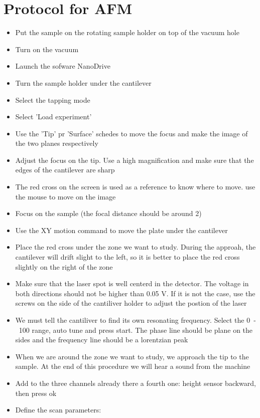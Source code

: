 \documentclass[a4paper]{article}
\begin{document}
\section{Protocol for AFM}
\begin{itemize}
  \item Put the sample on the rotating sample holder on top of the vacuum hole
  \item Turn on the vacuum
  \item Launch the sofware NanoDrive
  \item Turn the sample holder under the cantilever
  \item Select the tapping mode
  \item Select 'Load experiment'
  \item Use the 'Tip' pr 'Surface' schedes to move the focus and make the image of the two planes respectively
  \item Adjust the focus on the tip. Use a high magnification and make sure that the edges of the cantilever are sharp
  \item The red cross on the screen is used as a reference to know where to move. use the mouse to move on the image
  \item Focus on the sample (the focal distance should be around \unit{2}{\milli\meter})
  \item Use the XY motion command to move the plate under the cantilever
  \item Place the red cross under the zone we want to study. During the approah, the cantilever will drift slight to the left, so it is better to place the red cross slightly on the right of the zone
  \item Make sure that the laser spot is well centerd in the detector. The voltage in both directions should not be higher than 0.05 V. If it is not the case, use the screws on the side of the cantiliver holder to adjust the postion of the laser
  \item We must tell the cantiliver to find its own resonating frequency. Select the \unit{0-100}{\kilo\hertz} range, auto tune and press start. The phase line should be plane on the sides and the frequency line should be a lorentzian peak
  \item When we are around the zone we want to study, we approach the tip to the sample. At the end of this procedure we will hear a sound from the machine
  \item Add to the three channels already there a fourth one: height sensor backward, then press ok
  \item Define the scan parameters:

\end{itemize}
\end{document}
